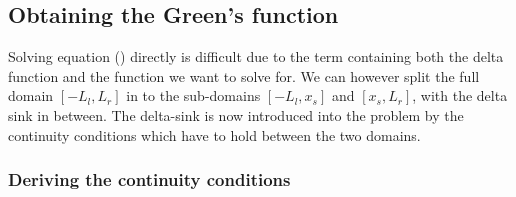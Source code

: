 \subsection{Obtaining the Green's function}

Solving equation () directly is difficult due to the term containing both the delta function and the function we want to solve for. We can however split the full domain $[-L_l,L_r]$ in to the sub-domains $[-L_l,x_s]$ and $[x_s,L_r]$, with the delta sink in between. The delta-sink is now introduced into the problem by the continuity conditions which have to hold between the two domains. 

\subsubsection{Deriving the continuity conditions}

